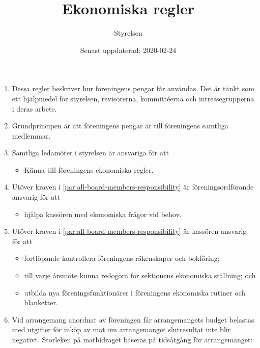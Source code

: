 \documentclass{dvd}
\begin{document}
	\title{Ekonomiska regler}
	\author{Styrelsen}
	\date{Senast uppdaterad: 2020-02-24}

	\begin{enumerate}[label=\arabic* §, ref=\arabic*]
		\item Dessa regler beskriver hur föreningens pengar får användas.
		Det är tänkt som ett hjälpmedel för styrelsen, revisorerna, kommittéerna och intressegrupperna i deras arbete.

		\item Grundprincipen är att föreningens pengar är till föreningens samtliga medlemmar.

		\item Samtliga ledamöter i styrelsen är ansvariga för att

		\begin{itemize}
			\item Känna till föreningens ekonomiska regler.
		\end{itemize}
		\label{par:all-board-members-responsibility}

		\item Utöver kraven i \ref{par:all-board-members-responsibility} är föreningsordförande ansvarig för att

		\begin{itemize}
			\item hjälpa kassören med ekonomiska frågor vid behov.
		\end{itemize}

		\item Utöver kraven i \ref{par:all-board-members-responsibility} är kassören ansvarig för att

		\begin{itemize}

			\item fortlöpande kontrollera föreningens räkenskaper och bokföring;

			\item till varje årsmöte kunna redogöra för sektionens ekonomiska ställning; och

			\item utbilda nya föreningsfunktionärer i föreningens ekonomiska rutiner och blanketter.

		\end{itemize}

		\item Vid arrangemang anordnat av föreningen får arrangemangets budget belastas med utgifter för inköp av mat om arrangemanget slutresultat inte blir negativt.
		Storleken på matbidraget baseras på tidsåtgång för arrangemanget:


\end{enumerate}
\end{document}
